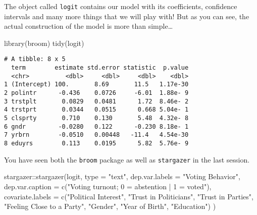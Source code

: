 \documentclass[
  letterpaper,
  DIV=11,
  numbers=noendperiod]{scrreprt}
\newenvironment{Shaded}{\begin{snugshade}}{\end{snugshade}}
\newcommand{\AttributeTok}[1]{\textcolor[rgb]{0.40,0.45,0.13}{#1}}
\newcommand{\FunctionTok}[1]{\textcolor[rgb]{0.28,0.35,0.67}{#1}}
\newcommand{\NormalTok}[1]{\textcolor[rgb]{0.00,0.23,0.31}{#1}}
\newcommand{\SpecialCharTok}[1]{\textcolor[rgb]{0.37,0.37,0.37}{#1}}
\newcommand{\StringTok}[1]{\textcolor[rgb]{0.13,0.47,0.30}{#1}}
\begin{document}
The object called \texttt{logit} contains our model with its
coefficients, confidence intervals and many more things that we will
play with! But as you can see, the actual construction of the model is
more than simple\ldots{}

\begin{Shaded}
\begin{Highlighting}[]
\FunctionTok{library}\NormalTok{(broom)}
\FunctionTok{tidy}\NormalTok{(logit)}
\end{Highlighting}
\end{Shaded}

\begin{verbatim}
# A tibble: 8 x 5
  term        estimate std.error statistic  p.value
  <chr>          <dbl>     <dbl>     <dbl>    <dbl>
1 (Intercept) 100.       8.69       11.5   1.17e-30
2 polintr      -0.436    0.0726     -6.01  1.88e- 9
3 trstplt       0.0829   0.0481      1.72  8.46e- 2
4 trstprt       0.0344   0.0515      0.668 5.04e- 1
5 clsprty       0.710    0.130       5.48  4.32e- 8
6 gndr         -0.0280   0.122      -0.230 8.18e- 1
7 yrbrn        -0.0510   0.00448   -11.4   4.54e-30
8 eduyrs        0.113    0.0195      5.82  5.76e- 9
\end{verbatim}

You have seen both the \texttt{broom} package as well as
\texttt{stargazer} in the last session.

\begin{Shaded}
\begin{Highlighting}[]
\NormalTok{stargazer}\SpecialCharTok{::}\FunctionTok{stargazer}\NormalTok{(logit, }
          \AttributeTok{type =} \StringTok{"text"}\NormalTok{,}
          \AttributeTok{dep.var.labels =} \StringTok{"Voting Behavior"}\NormalTok{,}
          \AttributeTok{dep.var.caption =} \FunctionTok{c}\NormalTok{(}\StringTok{"Voting turnout; 0 = abstention | 1 = voted"}\NormalTok{),}
          \AttributeTok{covariate.labels =} \FunctionTok{c}\NormalTok{(}\StringTok{"Political Interest"}\NormalTok{, }\StringTok{"Trust in Politicians"}\NormalTok{,}
                             \StringTok{"Trust in Parties"}\NormalTok{, }\StringTok{"Feeling Close to a Party"}\NormalTok{,}
                             \StringTok{"Gender"}\NormalTok{, }\StringTok{"Year of Birth"}\NormalTok{, }\StringTok{"Education"}\NormalTok{)}
\NormalTok{          )}
\end{Highlighting}
\end{Shaded}
\end{document}
